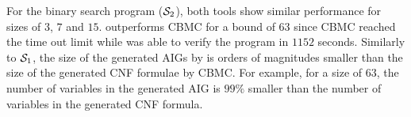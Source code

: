 For the binary search program ($\mathcal{S}_2$), both tools show similar performance for sizes of $3$, $7$
and $15$. \mytool{} outperforms CBMC for a bound of $63$ since CBMC reached the time out limit
while \mytool{} was able to verify the program in $1152$ seconds. Similarly to $\mathcal{S}_1$, 
the size of the generated AIGs by \mytool{} is orders of magnitudes smaller than the size of the 
generated CNF formulae by CBMC. For example, for a size of $63$, the number of variables  
in the generated AIG is $99\%$ smaller than the number of variables in the generated CNF formula.